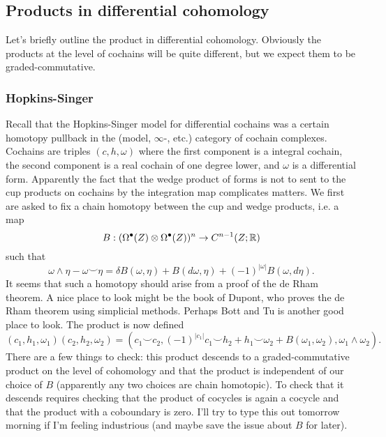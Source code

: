 \documentclass{amsart}
\begin{document}
\subsection{Products in differential cohomology}
Let's briefly outline the product in differential cohomology. Obviously the products
at the level of cochains will be quite different, but we expect them to be
graded-commutative.
\subsubsection{Hopkins-Singer}
Recall that the Hopkins-Singer model for differential cochains was a certain
homotopy pullback in the (model, $\infty$-, etc.) category of cochain complexes.
Cochains are triples $(c, h, \omega)$ where the first component is a integral
cochain, the second component is a real cochain of one degree lower, and $\omega$
is a differential form. Apparently the fact that the wedge product of forms
is not to sent to the cup products on cochains by the integration map complicates
matters.
We first are asked to fix a chain homotopy between the cup and wedge products, i.e.
a map
\begin{equation*}
    B: (\Omega^\bullet(Z)\otimes\Omega^\bullet(Z))^n\to C^{n-1}(Z;\mathbb{R})
\end{equation*}
such that
\begin{equation*}
    \omega\wedge \eta - \omega\smile\eta = \delta B(\omega,\eta)+B(d\omega,\eta)+(-1)^{|\omega|}B(\omega,d\eta).
\end{equation*}
It seems that such a homotopy should arise from a proof of the de Rham theorem. A nice
place to look might be the book of Dupont, who proves the de Rham theorem using simplicial
methods. Perhaps Bott and Tu is another good place to look. The product is now defined
\begin{equation*}
    (c_1,h_1,\omega_1)(c_2,h_2,\omega_2) = (c_1\smile c_2,(-1)^{|c_1|}c_1\smile h_2+h_1\smile \omega_2 + B(\omega_1,\omega_2), \omega_1\wedge\omega_2).
\end{equation*}
There are a few things to check: this product descends to a graded-commutative product
on the level of cohomology and that the product is independent of our choice of $B$ (apparently
any two choices are chain homotopic). To check that it descends requires checking that
the product of cocycles is again a cocycle and that the product with a coboundary is zero.
I'll try to type this out tomorrow morning if I'm feeling industrious (and maybe save
the issue about $B$ for later).
\end{document}
